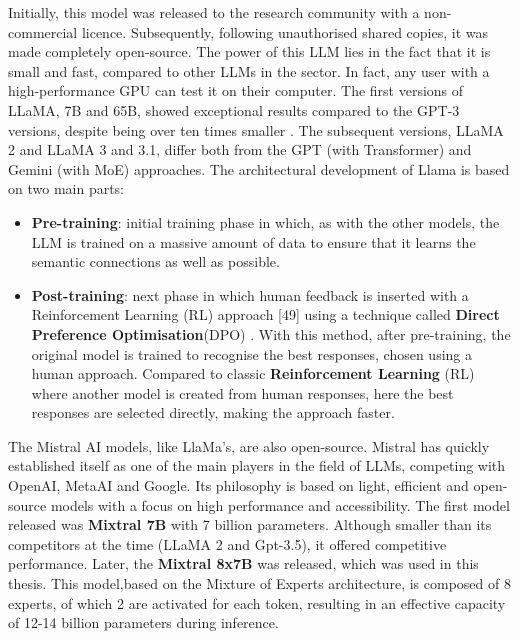 Initially, this model was released to the research community with a non-commercial licence. Subsequently, following unauthorised shared copies, it was made completely open-source. The power of this LLM lies in the fact that it is small and fast, compared to other LLMs in the sector. In fact, any user with a high-performance GPU can test it on their computer.
The first versions of LLaMA, 7B and 65B, showed exceptional results compared to the GPT-3 versions, despite being over ten times smaller \cite{touvron2023llamaopenefficientfoundation}.
The subsequent versions, LLaMA 2 and LLaMA 3 and 3.1, differ both from the GPT (with Transformer) and Gemini (with MoE) approaches. The architectural development of Llama is based on two main parts:\\
\begin{itemize}
    \item \textbf{Pre-training}: initial training phase in which, as with the other models, the LLM is trained on a massive amount of data to ensure that it learns the semantic connections as well as possible.
    \item \textbf{Post-training}: next phase in which human feedback is inserted with a Reinforcement Learning (RL) approach [49] using a technique called \textbf{Direct Preference Optimisation}(DPO) \cite{rafailov2024directpreferenceoptimizationlanguage}.
    With this method, after pre-training, the original model is trained to recognise the best responses, chosen using a human approach. Compared to classic \textbf{Reinforcement Learning} (RL) where another model is created from human responses, here the best responses are selected directly, making the approach faster.   
\end{itemize}
The Mistral AI models, like LlaMa's, are also open-source. Mistral has quickly established itself as one of the main players in the field of LLMs, competing with OpenAI, MetaAI and Google. 
Its philosophy is based on light, efficient and open-source models with a focus on high performance and accessibility. The first model released was \textbf{Mixtral 7B} \cite{Mixtral7b} with 7 billion parameters.
Although smaller than its competitors at the time (LLaMA 2 and Gpt-3.5), it offered competitive performance.
Later, the \textbf{Mixtral 8x7B}\cite{Mixtral8} was released, which was used in this thesis.
This model,based on the Mixture of Experts architecture, is composed of 8 experts, of which 2 are activated for each token, resulting in an effective capacity of 12-14 billion parameters during inference.

